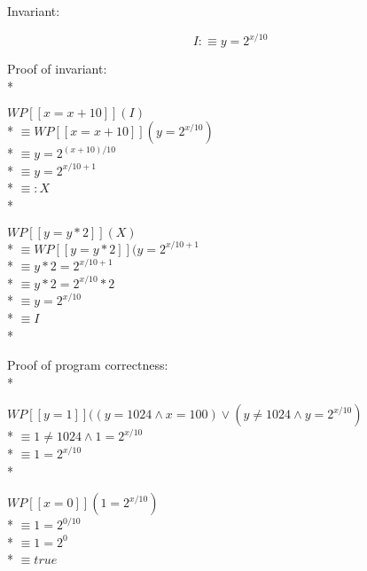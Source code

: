 \documentclass{article}
\begin{document}
Invariant:

$$ I:\equiv y=2^{x/10} $$

Proof of invariant: \\*

$ WP[\![x=x+10]\!](I) $ \\*
$ \equiv WP[\![x=x+10]\!](y=2^{x/10}) $ \\*
$ \equiv y=2^{(x+10)/10} $ \\*
$ \equiv y=2^{x/10+1} $ \\*
$ \equiv: X $ \\*

$ WP[\![y=y*2]\!](X) $ \\*
$ \equiv WP[\![y=y*2]\!](y=2^{x/10+1} $ \\*
$ \equiv y*2=2^{x/10+1} $ \\*
$ \equiv y*2=2^{x/10}*2 $ \\*
$ \equiv y=2^{x/10} $ \\*
$ \equiv I $ \\*

Proof of program correctness: \\*

$ WP[\![y=1]\!]((y=1024 \land x=100) \lor (y\ne 1024 \land y=2^{x/10}) $ \\*
$ \equiv 1\ne 1024 \land 1=2^{x/10} $ \\*
$ \equiv 1=2^{x/10} $ \\*

$ WP[\![x=0]\!](1=2^{x/10}) $ \\*
$ \equiv 1=2^{0/10} $ \\*
$ \equiv 1=2^0 $ \\*
$ \equiv true $
\end{document}
